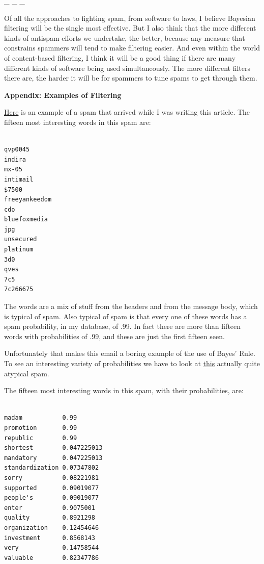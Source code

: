 \_ \_ \_

Of all the approaches to fighting spam, from software to laws, I believe
Bayesian filtering will be the single most effective. But I also think
that the more different kinds of antispam efforts we undertake, the
better, because any measure that constrains spammers will tend to make
filtering easier. And even within the world of content-based filtering,
I think it will be a good thing if there are many different kinds of
software being used simultaneously. The more different filters there
are, the harder it will be for spammers to tune spams to get through
them.

\textbf{Appendix: Examples of Filtering}

\href{https://sep.turbifycdn.com/ty/cdn/paulgraham/spam1.txt?t=1688221954&}{Here}
is an example of a spam that arrived while I was writing this article.
The fifteen most interesting words in this spam are:

\begin{verbatim}

qvp0045
indira
mx-05
intimail
$7500
freeyankeedom
cdo
bluefoxmedia
jpg
unsecured
platinum
3d0
qves
7c5
7c266675
\end{verbatim}

The words are a mix of stuff from the headers and from the message body,
which is typical of spam. Also typical of spam is that every one of
these words has a spam probability, in my database, of .99. In fact
there are more than fifteen words with probabilities of .99, and these
are just the first fifteen seen.

Unfortunately that makes this email a boring example of the use of
Bayes' Rule. To see an interesting variety of probabilities we have to
look at
\href{https://sep.turbifycdn.com/ty/cdn/paulgraham/spam2.txt?t=1688221954&}{this}
actually quite atypical spam.

The fifteen most interesting words in this spam, with their
probabilities, are:

\begin{verbatim}

madam           0.99
promotion       0.99
republic        0.99
shortest        0.047225013
mandatory       0.047225013
standardization 0.07347802
sorry           0.08221981
supported       0.09019077
people's        0.09019077
enter           0.9075001
quality         0.8921298
organization    0.12454646
investment      0.8568143
very            0.14758544
valuable        0.82347786
\end{verbatim}

